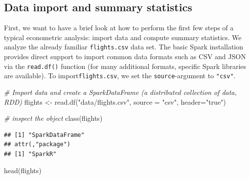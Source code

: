 \documentclass[
  12pt,
]{style/krantz}
\newenvironment{Shaded}{\begin{snugshade}}{\end{snugshade}}
\newcommand{\AttributeTok}[1]{\textcolor[rgb]{0.77,0.63,0.00}{#1}}
\newcommand{\CommentTok}[1]{\textcolor[rgb]{0.56,0.35,0.01}{\textit{#1}}}
\newcommand{\FunctionTok}[1]{\textcolor[rgb]{0.00,0.00,0.00}{#1}}
\newcommand{\NormalTok}[1]{#1}
\newcommand{\OtherTok}[1]{\textcolor[rgb]{0.56,0.35,0.01}{#1}}
\newcommand{\StringTok}[1]{\textcolor[rgb]{0.31,0.60,0.02}{#1}}
\begin{document}
\hypertarget{data-import-and-summary-statistics}{%
\subsection{Data import and summary statistics}\label{data-import-and-summary-statistics}}

First, we want to have a brief look at how to perform the first few steps of a typical econometric analysis: import data and compute summary statistics. We analyze the already familiar \texttt{flights.csv} data set. The basic Spark installation provides direct support to import common data formats such as CSV and JSON via the \texttt{read.df()} function (for many additional formats, specific Spark libraries are available). To import\texttt{flights.csv}, we set the \texttt{source}-argument to \texttt{"csv"}.

\begin{Shaded}
\begin{Highlighting}[]
\CommentTok{\# Import data and create a SparkDataFrame (a distributed collection of data, RDD)}
\NormalTok{flights }\OtherTok{\textless{}{-}} \FunctionTok{read.df}\NormalTok{(}\StringTok{"data/flights.csv"}\NormalTok{, }\AttributeTok{source =} \StringTok{"csv"}\NormalTok{, }\AttributeTok{header=}\StringTok{"true"}\NormalTok{)}


\CommentTok{\# inspect the object}
\FunctionTok{class}\NormalTok{(flights)}
\end{Highlighting}
\end{Shaded}

\begin{verbatim}
## [1] "SparkDataFrame"
## attr(,"package")
## [1] "SparkR"
\end{verbatim}

\begin{Shaded}
\begin{Highlighting}[]
\FunctionTok{head}\NormalTok{(flights)}
\end{Highlighting}
\end{Shaded}
\end{document}
